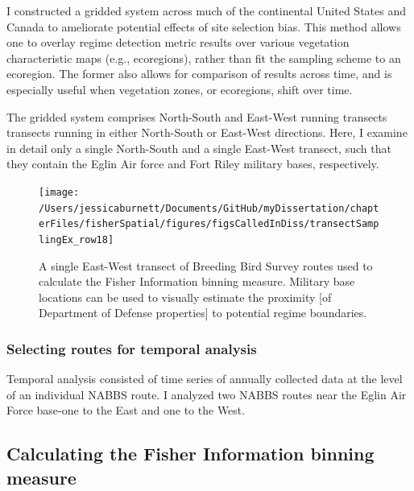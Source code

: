 \documentclass[12pt,twoside,openany]{reedthesis}
\begin{document}
I constructed a gridded system across much of the continental United
States and Canada to ameliorate potential effects of site selection
bias. This method allows one to overlay regime detection metric results
over various vegetation characteristic maps (e.g., ecoregions), rather
than fit the sampling scheme to an ecoregion. The former also allows for
comparison of results across time, and is especially useful when
vegetation zones, or ecoregions, shift over time.

The gridded system comprises North-South and East-West running transects
transects running in either North-South or East-West directions. Here, I
examine in detail only a single North-South and a single East-West
transect, such that they contain the Eglin Air force and Fort Riley
military bases, respectively.
\begin{figure}

{\centering \texttt{[image: /Users/jessicaburnett/Documents/GitHub/myDissertation/chapterFiles/fisherSpatial/figures/figsCalledInDiss/transectSamplingEx\_row18]} 

}

\caption{A single East-West transect of Breeding Bird Survey routes used to calculate the Fisher Information binning measure. Military base locations can be used to visually estimate the proximity [of Department of Defense properties] to potential regime boundaries.}\label{fig:ewRouteMap}
\end{figure}
\subsubsection{Selecting routes for temporal
analysis}\label{selecting-routes-for-temporal-analysis}

Temporal analysis consisted of time series of annually collected data at
the level of an individual NABBS route. I analyzed two NABBS routes near
the Eglin Air Force base-one to the East and one to the West.

\subsection{Calculating the Fisher Information binning
measure}\label{calculating-the-fisher-information-binning-measure}
\end{document}
